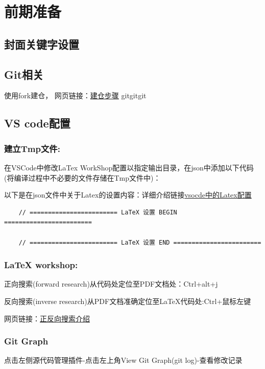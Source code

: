 \documentclass[engineeringmaster]{hquThesis}
\begin{document}
\makecover
% 
% 

\frontmatter{
    
    \tableofcontents
}

\mainmatter
\chapter{前期准备}
\section{封面关键字设置}
\section{Git相关}
使用fork建仓，
网页链接：\href{https://docs.github.com/en/repositories/creating-and-managing-repositories/creating-a-template-repository}{建仓步骤}
gitgitgit 
\section{VS code配置}
\subsection*{建立Tmp文件:}
在VSCode中修改LaTex WorkShop配置以指定输出目录，在json中添加以下代码(将编译过程中不必要的文件存储在Tmp文件中)：

以下是在json文件中关于Latex的设置内容：详细介绍链接\href{https://zhuanlan.zhihu.com/p/166523064}{vsocde中的Latex配置}
\begin{lstlisting}
    // ======================== LaTeX 设置 BEGIN  ========================

    // ======================== LaTeX 设置 END ========================
\end{lstlisting}

\subsection*{LaTeX workshop: }

正向搜索(forward research)从代码处定位至PDF文档处：Ctrl+alt+j

反向搜索(inverse research)从PDF文档准确定位至LaTeX代码处:Ctrl+鼠标左键

网页链接：\href{https://github.com/James-Yu/LaTeX-Workshop/wiki/View#synctex}{正反向搜索介绍}
\subsection*{Git Graph}
点击左侧源代码管理插件-点击左上角View Git Graph(git log)-查看修改记录
\end{document}

